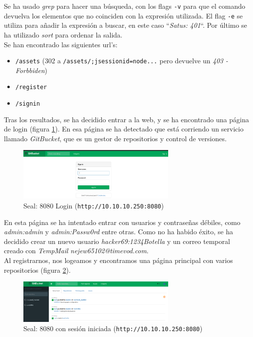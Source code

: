 Se ha usado \textit{grep} para hacer una búsqueda, con los flags \texttt{-v} para que el comando devuelva los elementos que no coinciden con la expresión utilizada. El flag \texttt{-e} se utiliza para añadir la expresión a buscar, en este caso ``\textit{Satus: 401}``. Por último se ha utilizado \textit{sort} para ordenar la salida.\\

Se han encontrado las siguientes \acrshort{url}'s:
\begin{itemize}
    \item \texttt{/assets} (302 a \texttt{/assets/;jsessionid=node...} pero devuelve un \textit{403 - Forbbiden})
    \item \texttt{/register}
    \item \texttt{/signin}
\end{itemize}

Tras los resultados, se ha decidido entrar a la web, y se ha encontrado una página de login (figura \ref{fig:seal-8080-main}). En esa página se ha detectado que está corriendo un servicio llamado \textit{GitBucket}\cite{gitbucket}, que es un gestor de repositorios y control de versiones.\\

\begin{figure}[h]
    \centering
    \includegraphics[width=0.70\textwidth]{images/machines/seal/main-page.png}
    \caption{Seal: 8080 Login (\texttt{http://10.10.10.250:8080})}
    \label{fig:seal-8080-main}
\end{figure}

En esta página se ha intentado entrar con usuarios y contraseñas débiles, como \textit{admin:admin} y \textit{admin:Passw0rd} entre otras. Como no ha habido éxito, se ha decidido crear un nuevo usuario \textit{hacker69:1234Botella} y un correo temporal creado con \textit{TempMail}\cite{tempmail} \textit{nejew65102@timevod.com}.\\

Al registrarnos, nos logeamos y encontramos una página principal con varios repositorios (figura \ref{fig:seal-8080-main-logged}).\\

\begin{figure}[h]
    \centering
    \includegraphics[width=0.70\textwidth]{images/machines/seal/main-logged.png}
    \caption{Seal: 8080 con sesión iniciada (\texttt{http://10.10.10.250:8080})}
    \label{fig:seal-8080-main-logged}
\end{figure}

